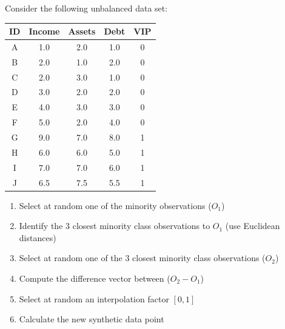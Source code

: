 \begin{exerciseboxpaper}
Consider the following unbalanced data set: \\

\renewcommand{\arraystretch}{1.25}
\begin{tabular}{c | c | c | c | c}
\textbf{ID} & \textbf{Income} & \textbf{Assets} & \textbf{Debt} & \textbf{VIP} \\
\hline
A & 1.0 & 2.0 & 1.0 & 0 \\
B & 2.0 & 1.0 & 2.0 & 0 \\
C & 2.0 & 3.0 & 1.0 & 0 \\
D & 3.0 & 2.0 & 2.0 & 0 \\
E & 4.0 & 3.0 & 3.0 & 0 \\
F & 5.0 & 2.0 & 4.0 & 0 \\
G & 9.0 & 7.0 & 8.0 & 1 \\
H & 6.0 & 6.0 & 5.0 & 1 \\
I & 7.0 & 7.0 & 6.0 & 1 \\
J & 6.5 & 7.5 & 5.5 & 1 \\
\end{tabular}

\vspace{\baselineskip}
\begin{enumerate}
   \item Select at random one of the minority observations ($O_1$)
   \item Identify the 3 closest minority class observations to $O_1$ (use Euclidean distances)
   \item Select at random one of the 3 closest minority class observations ($O_2$)
   \item Compute the difference vector between ($O_2 - O_1$)
   \item Select at random an interpolation factor $[0, 1]$
   \item Calculate the new synthetic data point
\end{enumerate}
\end{exerciseboxpaper}

